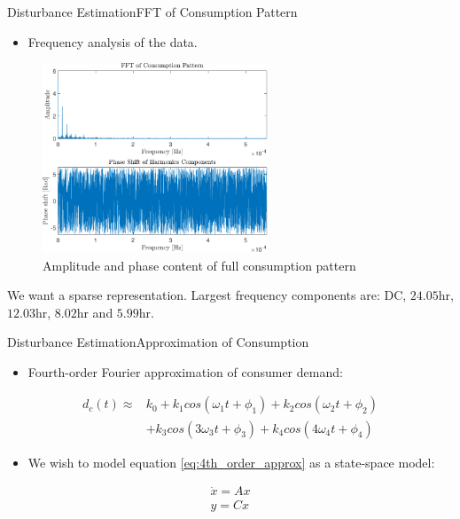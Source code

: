 	
\begin{frame}{Disturbance Estimation}{FFT of Consumption Pattern}
	\begin{itemize}
		\item Frequency analysis of the data. 
	\end{itemize}
	
	 \begin{figure}[h!]
		\centering
		\includegraphics[width=0.6\textwidth]{Topics/KalmanEstimator/Graphics/FFT.pdf}
		\caption{Amplitude and phase content of full consumption pattern}
		\label{fig:FFT_Consumption_Patter}
	\end{figure}
	
 We want a sparse representation. Largest frequency components are: DC, $24.05 \text{hr}$, $12.03 \text{hr}$, $8.02 \text{hr}$ and $5.99 \text{hr}$.

\end{frame}

\begin{frame}{Disturbance Estimation}{Approximation of Consumption}
		
	\begin{itemize}
		\item Fourth-order Fourier approximation of consumer demand:
	\end{itemize}
		
	\begin{equation} \label{eq:4th_order_approx}
		\begin{split}
			d_c(t) \approx& k_0 + k_1 cos(\omega_1 t + \phi_1) + k_2 cos(\omega_2 t + \phi_2)\\
			&+ k_3 cos(3\omega_3 t + \phi_3) + k_4 cos(4\omega_4 t + \phi_4)
		\end{split}
	\end{equation}

	\begin{itemize}
		\item We wish to model equation \ref{eq:4th_order_approx} as a state-space model:
	\end{itemize}
		
		\begin{equation*}
		\begin{split}
			\dot{x}=Ax\\
			y=Cx
		\end{split}
		\end{equation*}	
\end{frame}

